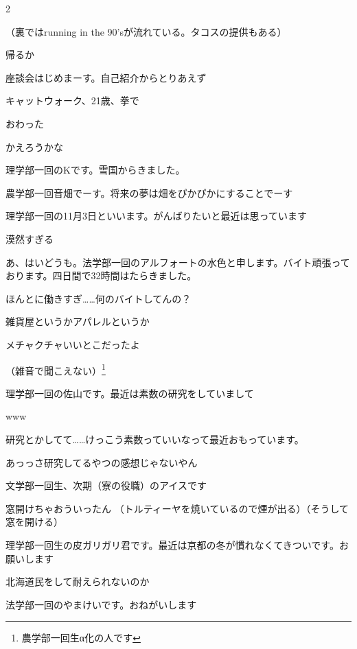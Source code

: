\begin{multicols}{2}


（裏ではrunning in the 90’sが流れている。タコスの提供もある）

 帰るか

 座談会はじめまーす。自己紹介からとりあえず

 キャットウォーク、21歳、拳で

 おわった

 かえろうかな

 理学部一回のKです。雪国からきました。

 農学部一回音畑でーす。将来の夢は畑をぴかぴかにすることでーす

 理学部一回の11月3日といいます。がんばりたいと最近は思っています

 漠然すぎる

 あ、はいどうも。法学部一回のアルフォートの水色と申します。バイト頑張っております。四日間で32時間はたらきました。

 ほんとに働きすぎ……何のバイトしてんの？

 雑貨屋というかアパレルというか

 メチャクチャいいとこだったよ

 （雑音で聞こえない）\footnote{農学部一回生α化の人です}

 理学部一回の佐山です。最近は素数の研究をしていまして

 www

 研究とかしてて……けっこう素数っていいなって最近おもっています。

 あっっさ研究してるやつの感想じゃないやん

 文学部一回生、次期（寮の役職）のアイスです

 窓開けちゃおういったん
（トルティーヤを焼いているので煙が出る）（そうして窓を開ける）

 理学部一回生の皮ガリガリ君です。最近は京都の冬が慣れなくてきついです。お願いします

 北海道民をして耐えられないのか

 法学部一回のやまけいです。おねがいします


\end{multicols}
